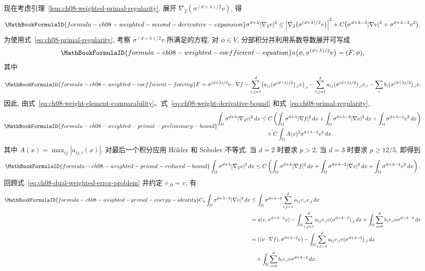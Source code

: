 现在考虑引理~\ref{lem:ch08-weighted-primal-regularity}. 展开 $\nabla_2(\sigma^{(d+\lambda)/2}v)$, 得
\begin{equation}
\MathBookFormulaID{formula-ch08-weighted-second-derivative-expansion}
\label{eq:ch08-weighted-second-derivative-expansion}
\sigma^{d+\lambda}|\nabla_2v|^2
\leq\left|\nabla_2\bigl(\sigma^{(d+\lambda)/2}v\bigr)\right|^2
+C\bigl(\sigma^{d+\lambda-2}|\nabla v|^2+\sigma^{d+\lambda-4}v^2\bigr).
\end{equation}
为使用式~\eqref{eq:ch08-primal-regularity}, 考察 $\sigma^{(d+\lambda)/2}v$ 所满足的方程. 对 $\phi\in V$, 分部积分并利用系数导数展开可写成
\[
\MathBookFormulaID{formula-ch08-weighted-coefficient-equation}
a\bigl(\phi,\sigma^{(d+\lambda)/2}v\bigr)=(F,\phi),
\]
其中
\[
\MathBookFormulaID{formula-ch08-weighted-coefficient-forcing}
F=\sigma^{(d+\lambda)/2}\nu\cdot\nabla f
-\sum_{i,j=1}^{d}\bigl(a_{ij}(\sigma^{(d+\lambda)/2})_{,j}v\bigr)_{,i}
-\sum_{i,j=1}^{d}a_{ij}(\sigma^{(d+\lambda)/2})_{,j}v_{,i}
-\sum_i b_i(\sigma^{(d+\lambda)/2})_{,i}v.
\]
因此, 由式~\eqref{eq:ch08-weight-element-comparability}、式~\eqref{eq:ch08-weight-derivative-bound} 和式~\eqref{eq:ch08-primal-regularity},
\[
\MathBookFormulaID{formula-ch08-weighted-primal-preliminary-bound}
\begin{aligned}
\int_\Omega\sigma^{d+\lambda}|\nabla_2v|^2\,dx
&\leq C\left(\int_\Omega\sigma^{d+\lambda}|\nabla f|^2\,dx
+\int_\Omega\sigma^{d+\lambda-2}|\nabla v|^2\,dx
+\int_\Omega\sigma^{d+\lambda-4}v^2\,dx\right)\\
&\quad+C\int_\Omega A(x)^2\sigma^{d+\lambda-2}v^2\,dx.
\end{aligned}
\]
其中 $A(x)=\max_{ij}|a_{ij,i}(x)|$. 对最后一个积分应用 Hölder 和 Sobolev 不等式. 当 $d=2$ 时要求 $p>2$, 当 $d=3$ 时要求 $p\geq12/5$, 即得到
\[
\MathBookFormulaID{formula-ch08-weighted-primal-reduced-bound}
\int_\Omega\sigma^{d+\lambda}|\nabla_2v|^2\,dx
\leq C\left(\int_\Omega\sigma^{d+\lambda}|\nabla f|^2\,dx
+\int_\Omega\sigma^{d+\lambda-2}|\nabla v|^2\,dx
+\int_\Omega\sigma^{d+\lambda-4}v^2\,dx\right).
\]
回顾式~\eqref{eq:ch08-dual-weighted-error-problem} 并约定 $v_{,0}=v$, 有
\begin{align}
\MathBookFormulaID{formula-ch08-weighted-primal-energy-identity}
C_a\int_\Omega\sigma^{d+\lambda-2}|\nabla v|^2\,dx
&\leq\int_\Omega\sigma^{d+\lambda-2}
\sum_{i,j=1}^{d}a_{ij}v_{,i}v_{,j}\,dx\notag\\
&=a(v,\sigma^{d+\lambda-2}v)
-\int_\Omega\sum_{i,j=1}^{d}a_{ij}v_{,i}v
(\sigma^{d+\lambda-2})_{,j}\,dx
+\int_\Omega\sum_{i=0}^{d}b_iv_{,i}v\sigma^{d+\lambda-2}\,dx\notag\\
&=((\nu\cdot\nabla f),\sigma^{d+\lambda-2}v)
-\int_\Omega\sum_{i,j=1}^{d}a_{ij}v_{,i}v
(\sigma^{d+\lambda-2})_{,j}\,dx\notag\\
&\quad+\int_\Omega\sum_{i=0}^{d}b_iv_{,i}v\sigma^{d+\lambda-2}\,dx.
\label{eq:ch08-weighted-primal-energy-identity}
\end{align}
